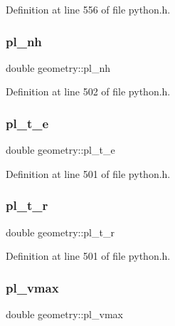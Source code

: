 Definition at line 556 of file python.\+h.

\mbox{\label{structgeometry_ad3248dbaffd722b3eeaf3431dbd49ec7}} 
\subsubsection{\texorpdfstring{pl\+\_\+nh}{pl\_nh}}
{\footnotesize\ttfamily double geometry\+::pl\+\_\+nh}



Definition at line 502 of file python.\+h.

\mbox{\label{structgeometry_abeaa6daddc4cf0043c51162b4012b4c4}} 
\subsubsection{\texorpdfstring{pl\+\_\+t\+\_\+e}{pl\_t\_e}}
{\footnotesize\ttfamily double geometry\+::pl\+\_\+t\+\_\+e}



Definition at line 501 of file python.\+h.

\mbox{\label{structgeometry_ab2863864290d21c314d4b9000e8cb3c1}} 
\subsubsection{\texorpdfstring{pl\+\_\+t\+\_\+r}{pl\_t\_r}}
{\footnotesize\ttfamily double geometry\+::pl\+\_\+t\+\_\+r}



Definition at line 501 of file python.\+h.

\mbox{\label{structgeometry_a6d53080754f74d86d5677a6bef475cfb}} 
\subsubsection{\texorpdfstring{pl\+\_\+vmax}{pl\_vmax}}
{\footnotesize\ttfamily double geometry\+::pl\+\_\+vmax}



